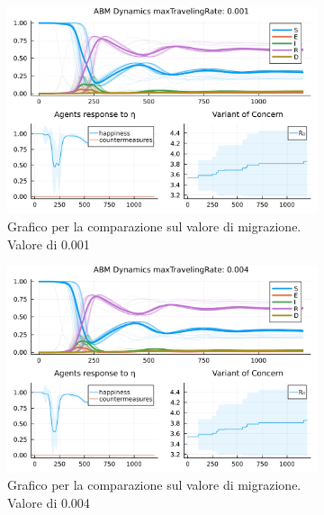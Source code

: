 \begin{figure}[H]
	\centering
	\begin{subfigure}[b]{0.45\textwidth}
		\centering
		\includegraphics[width=\textwidth]{img/SocialNetworkABM_1_MTR.jpg}
		\caption{Grafico per la comparazione sul valore di migrazione. Valore di 0.001}
		\label{fig:comparison_maxTravelingRate_low}
	\end{subfigure}
	\hfill
	\begin{subfigure}[b]{0.45\textwidth}
		\centering
		\includegraphics[width=\textwidth]{img/SocialNetworkABM_2_MTR.jpg}
		\caption{Grafico per la comparazione sul valore di migrazione. Valore di 0.004}
		\label{fig:comparison_maxTravelingRate_midl}
	\end{subfigure}
	\hfill
	\begin{subfigure}[b]{0.45\textwidth}
		\centering

\end{subfigure}
\end{figure}

